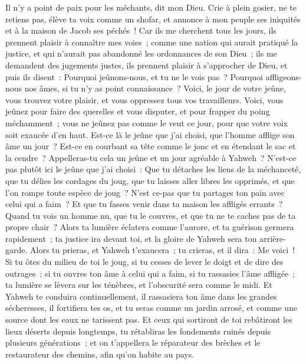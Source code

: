 \begin{multicols}{2}
Il n'y a point de paix pour les méchants, dit mon Dieu.
\VerseOne{}Crie à plein gosier, ne te retiens pas, élève ta voix comme un shofar, et annonce à mon peuple ses iniquités et à la maison de Jacob ses péchés~!
Car ils me cherchent tous les jours, ils prennent plaisir à connaître mes voies~; comme une nation qui aurait pratiqué la justice, et qui n'aurait pas abandonné les ordonnances de son Dieu~; ils me demandent des jugements justes, ils prennent plaisir à s'approcher de Dieu, et puis ils disent~:
Pourquoi jeûnons-nous, et tu ne le vois pas~? Pourquoi affligeons-nous nos âmes, si tu n'y as point connaissance~? Voici, le jour de votre jeûne, vous trouvez votre plaisir, et vous oppressez tous vos travailleurs.
Voici, vous jeûnez pour faire des querelles et vous disputer, et pour frapper du poing méchamment~; vous ne jeûnez pas comme le veut ce jour, pour que votre voix soit exaucée d'en haut.
Est-ce là le jeûne que j'ai choisi, que l'homme afflige son âme un jour~? Est-ce en courbant sa tête comme le jonc et en étendant le sac et la cendre~? Appelleras-tu cela un jeûne et un jour agréable à Yahweh~?
N'est-ce pas plutôt ici le jeûne que j'ai choisi~: Que tu détaches les liens de la méchanceté, que tu délies les cordages du joug, que tu laisses aller libres les opprimés, et que l'on rompe toute espèce de joug~?
N'est ce-pas que tu partages ton pain avec celui qui a faim~? Et que tu fasses venir dans ta maison les affligés errants~? Quand tu vois un homme nu, que tu le couvres, et que tu ne te caches pas de ta propre chair~?
Alors ta lumière éclatera comme l'aurore, et ta guérison germera rapidement~; ta justice ira devant toi, et la gloire de Yahweh sera ton arrière-garde.
Alors tu prieras, et Yahweh t'exaucera~; tu crieras, et il dira~: Me voici~! Si tu ôtes du milieu de toi le joug, si tu cesses de lever le doigt et de dire des outrages~;
si tu ouvres ton âme à celui qui a faim, si tu rassasies l'âme affligée~; ta lumière se lèvera sur les ténèbres, et l'obscurité sera comme le midi.
Et Yahweh te conduira continuellement, il rassasiera ton âme dans les grandes sécheresses, il fortifiera tes os, et tu seras comme un jardin arrosé, et comme une source dont les eaux ne tarissent pas.
Et ceux qui sortiront de toi rebâtiront les lieux déserts depuis longtemps, tu rétabliras les fondements ruinés depuis plusieurs générations~; et on t'appellera le réparateur des brèches et le restaurateur des chemins, afin qu'on habite au pays.

\end{multicols}
